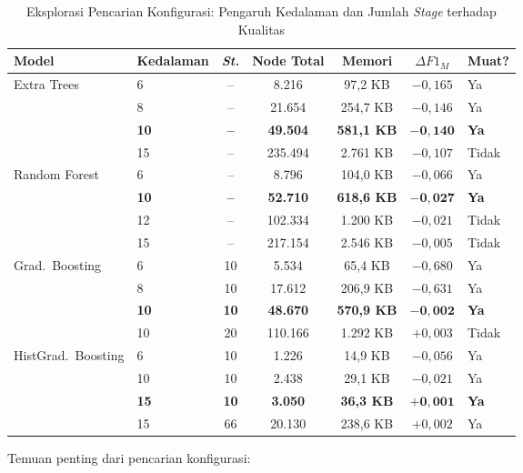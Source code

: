 \begin{table}[htbp]
\centering
\caption{Eksplorasi Pencarian Konfigurasi: Pengaruh Kedalaman dan Jumlah \textit{Stage} terhadap Kualitas}
\label{tab:depth_search_exploration}
\begin{tabular}{llccccl}
\hline
\textbf{Model} & \textbf{Kedalaman} & \textbf{\textit{St.}} & \textbf{Node Total} & \textbf{Memori} & \textbf{$\Delta F1_M$} & \textbf{Muat?} \\
\hline
\multirow{4}{*}{Extra Trees}
  & 6  & -- & 8.216   & 97,2 KB  & $-0{,}165$ & Ya \\
  & 8  & -- & 21.654  & 254,7 KB & $-0{,}146$ & Ya \\
  & \textbf{10} & \textbf{--} & \textbf{49.504}  & \textbf{581,1 KB} & $\mathbf{-0{,}140}$ & \textbf{Ya} \\
  & 15 & -- & 235.494 & 2.761 KB & $-0{,}107$ & Tidak \\
\hline
\multirow{4}{*}{Random Forest}
  & 6  & -- & 8.796   & 104,0 KB & $-0{,}066$ & Ya \\
  & \textbf{10} & \textbf{--} & \textbf{52.710}  & \textbf{618,6 KB} & $\mathbf{-0{,}027}$ & \textbf{Ya} \\
  & 12 & -- & 102.334 & 1.200 KB & $-0{,}021$ & Tidak \\
  & 15 & -- & 217.154 & 2.546 KB & $-0{,}005$ & Tidak \\
\hline
\multirow{4}{*}{Grad.\ Boosting}
  & 6  & 10 & 5.534   & 65,4 KB  & $-0{,}680$ & Ya \\
  & 8  & 10 & 17.612  & 206,9 KB & $-0{,}631$ & Ya \\
  & \textbf{10} & \textbf{10} & \textbf{48.670}  & \textbf{570,9 KB} & $\mathbf{-0{,}002}$ & \textbf{Ya} \\
  & 10 & 20 & 110.166 & 1.292 KB & $+0{,}003$ & Tidak \\
\hline
\multirow{4}{*}{HistGrad.\ Boosting}
  & 6  & 10 & 1.226   & 14,9 KB  & $-0{,}056$ & Ya \\
  & 10 & 10 & 2.438   & 29,1 KB  & $-0{,}021$ & Ya \\
  & \textbf{15} & \textbf{10} & \textbf{3.050}  & \textbf{36,3 KB}  & $\mathbf{+0{,}001}$ & \textbf{Ya} \\
  & 15 & 66 & 20.130  & 238,6 KB & $+0{,}002$ & Ya \\
\hline
\end{tabular}
\end{table}

Temuan penting dari pencarian konfigurasi:

